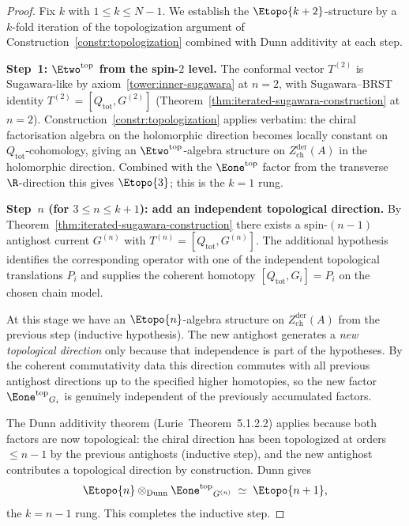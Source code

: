 \begin{proof}
Fix $k$ with $1 \le k \le N-1$. We establish the $\Etopo{k+2}$-structure
by a $k$-fold iteration of the topologization argument of
Construction~\ref{constr:topologization} combined with Dunn additivity
at each step.

\smallskip\noindent
\textbf{Step~1: $\Etwo^{\mathrm{top}}$ from the spin-$2$ level.}
The conformal vector $T^{(2)}$ is Sugawara-like by
axiom~\ref{tower:inner-sugawara} at $n = 2$, with Sugawara--BRST
identity $T^{(2)} = [Q_{\mathrm{tot}}, G^{(2)}]$
(Theorem~\ref{thm:iterated-sugawara-construction} at $n = 2$).
Construction~\ref{constr:topologization} applies verbatim: the chiral
factorisation algebra on the holomorphic direction becomes locally
constant on $Q_{\mathrm{tot}}$-cohomology, giving an
$\Etwo^{\mathrm{top}}$-algebra structure on
$Z^{\mathrm{der}}_{\mathrm{ch}}(A)$ in the holomorphic direction.
Combined with the $\Eone^{\mathrm{top}}$ factor from the transverse
$\R$-direction this gives $\Etopo{3}$; this is the $k = 1$ rung.

\smallskip\noindent
\textbf{Step~$n$ (for $3 \le n \le k+1$): add an independent
topological direction.}
By Theorem~\ref{thm:iterated-sugawara-construction} there exists a
spin-$(n-1)$ antighost current $G^{(n)}$ with
$T^{(n)} = [Q_{\mathrm{tot}}, G^{(n)}]$.
The additional hypothesis identifies the corresponding operator with
one of the independent topological translations $P_i$ and supplies the
coherent homotopy $[Q_{\mathrm{tot}},G_i]=P_i$ on the chosen chain
model.

At this stage we have an $\Etopo{n}$-algebra structure on
$Z^{\mathrm{der}}_{\mathrm{ch}}(A)$ from the previous step
(inductive hypothesis). The new antighost generates a
\emph{new topological direction} only because that independence is
part of the hypotheses. By the coherent commutativity data this
direction commutes with all previous antighost directions up to the
specified higher homotopies, so the new factor
${\Eone^{\mathrm{top}}}_{G_i}$ is genuinely independent of the
previously accumulated factors.

The Dunn additivity theorem (Lurie\,\cite{HA} Theorem~5.1.2.2)
applies because both factors are now topological: the chiral direction
has been topologized at orders $\le n-1$ by the previous antighosts
(inductive step), and the new antighost contributes a topological
direction by construction. Dunn gives
\begin{equation}\label{eq:Dunn-step-n}
\Etopo{n} \otimes_{\mathrm{Dunn}} {\Eone^{\mathrm{top}}}_{G^{(n)}}
\;\simeq\; \Etopo{n+1},
\end{equation}
the $k = n-1$ rung. This completes the inductive step.


\end{proof}
